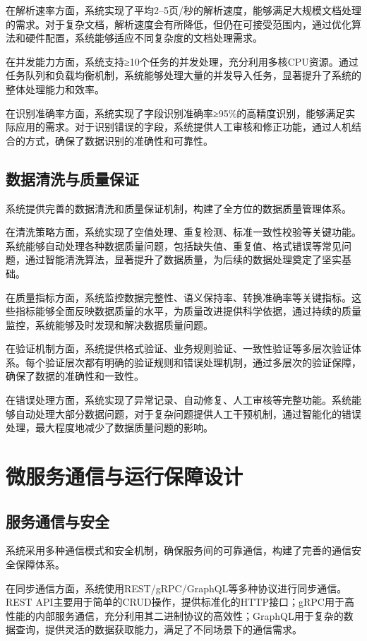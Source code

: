 在解析速率方面，系统实现了平均2–5页/秒的解析速度，能够满足大规模文档处理的需求。对于复杂文档，解析速度会有所降低，但仍在可接受范围内，通过优化算法和硬件配置，系统能够适应不同复杂度的文档处理需求。

在并发能力方面，系统支持≥10个任务的并发处理，充分利用多核CPU资源。通过任务队列和负载均衡机制，系统能够处理大量的并发导入任务，显著提升了系统的整体处理能力和效率。

在识别准确率方面，系统实现了字段识别准确率≥95\%的高精度识别，能够满足实际应用的需求。对于识别错误的字段，系统提供人工审核和修正功能，通过人机结合的方式，确保了数据识别的准确性和可靠性。

\subsection{数据清洗与质量保证}

系统提供完善的数据清洗和质量保证机制，构建了全方位的数据质量管理体系。

在清洗策略方面，系统实现了空值处理、重复检测、标准一致性校验等关键功能。系统能够自动处理各种数据质量问题，包括缺失值、重复值、格式错误等常见问题，通过智能清洗算法，显著提升了数据质量，为后续的数据处理奠定了坚实基础。

在质量指标方面，系统监控数据完整性、语义保持率、转换准确率等关键指标。这些指标能够全面反映数据质量的水平，为质量改进提供科学依据，通过持续的质量监控，系统能够及时发现和解决数据质量问题。

在验证机制方面，系统提供格式验证、业务规则验证、一致性验证等多层次验证体系。每个验证层次都有明确的验证规则和错误处理机制，通过多层次的验证保障，确保了数据的准确性和一致性。

在错误处理方面，系统实现了异常记录、自动修复、人工审核等完整功能。系统能够自动处理大部分数据问题，对于复杂问题提供人工干预机制，通过智能化的错误处理，最大程度地减少了数据质量问题的影响。

\section{微服务通信与运行保障设计}

\subsection{服务通信与安全}

系统采用多种通信模式和安全机制，确保服务间的可靠通信，构建了完善的通信安全保障体系。

在同步通信方面，系统使用REST/gRPC/GraphQL等多种协议进行同步通信。REST API主要用于简单的CRUD操作，提供标准化的HTTP接口；gRPC用于高性能的内部服务通信，充分利用其二进制协议的高效性；GraphQL用于复杂的数据查询，提供灵活的数据获取能力，满足了不同场景下的通信需求。

